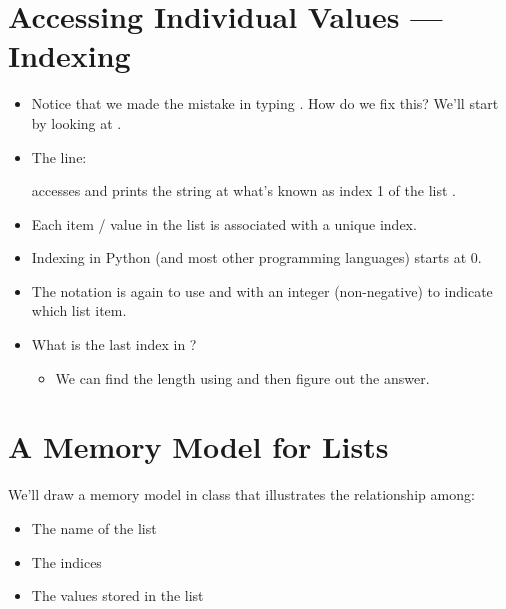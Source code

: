 \documentclass[letterpaper,10pt,english]{sphinxmanual}
\begin{document}
\section{Accessing Individual Values — Indexing}
\label{\detokenize{lecture_notes/lec08_lists1:accessing-individual-values-indexing}}\begin{itemize}
\item {} 
Notice that we made the mistake in typing . How do we fix
this? We’ll start by looking at .

\item {} 
The line:

\begin{sphinxVerbatim}[commandchars=\\\{\}]
\PYG{p}{[}\PYG{p}{]}
\end{sphinxVerbatim}

accesses and prints the string at what’s known as index 1 of the list
.

\item {} 
Each item / value in the list is associated with a unique index.

\item {} 
Indexing in Python (and most other programming languages) starts at
0.

\item {} 
The notation is again to use \sphinxcode{\sphinxupquote{{[}}} and \sphinxcode{\sphinxupquote{{]}}} with an integer
(non-negative) to indicate which list item.

\item {} 
What is the last index in ?
\begin{itemize}
\item {} 
We can find the length using  and then figure out the
answer.

\end{itemize}

\end{itemize}


\section{A Memory Model for Lists}
\label{\detokenize{lecture_notes/lec08_lists1:a-memory-model-for-lists}}
We’ll draw a memory model in class that illustrates the relationship
among:
\begin{itemize}
\item {} 
The name of the list

\item {} 
The indices

\item {} 
The values stored in the list

\end{itemize}
\end{document}
